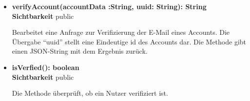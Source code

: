 \begin{itemize}
\item \textbf{verifyAccount(accountData :String, uuid: String): String}\hfill\\
\textbf{Sichtbarkeit} public

Bearbeitet eine Anfrage zur Verifizierung der E-Mail eines Accounts. Die Übergabe ``uuid'' stellt eine Eindeutige id des Accounts dar. Die Methode gibt einen JSON-String mit dem Ergebnis zurück.

\item \textbf{isVerfied(): boolean}\hfill\\
\textbf{Sichtbarkeit} public

Die Methode überprüft, ob ein Nutzer verifiziert ist.

\end{itemize}